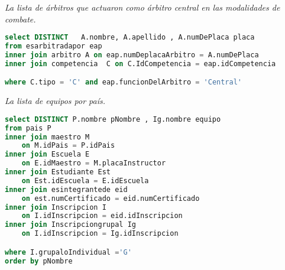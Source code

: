 \emph{La lista de árbitros que actuaron como árbitro central en las modalidades de combate.}
\begin{lstlisting}[language=SQL]
select DISTINCT   A.nombre, A.apellido , A.numDePlaca placa
from esarbitradapor eap
inner join arbitro A on eap.numDeplacaArbitro = A.numDePlaca
inner join competencia  C on C.IdCompetencia = eap.idCompetencia

where C.tipo = 'C' and eap.funcionDelArbitro = 'Central'
\end{lstlisting}


\emph{La lista de equipos por país.}
\begin{lstlisting}[language=SQL]
select DISTINCT P.nombre pNombre , Ig.nombre equipo
from pais P
inner join maestro M
    on M.idPais = P.idPais
inner join Escuela E
    on E.idMaestro = M.placaInstructor
inner join Estudiante Est
    on Est.idEscuela = E.idEscuela
inner join esintegrantede eid
    on est.numCertificado = eid.numCertificado
inner join Inscripcion I
    on I.idInscripcion = eid.idInscripcion
inner join Inscripciongrupal Ig
    on I.idInscripcion = Ig.idInscripcion

where I.grupaloIndividual ='G'
order by pNombre
\end{lstlisting}

